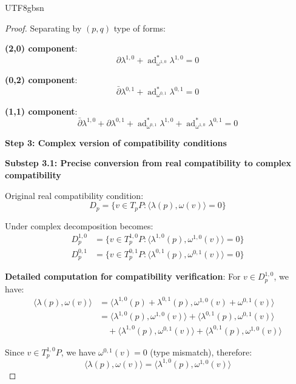 \documentclass[a4paper,12pt]{extarticle}
\theoremstyle{definition}
\begin{document}
\begin{CJK}{UTF8}{gbsn}
\begin{proof}
Separating by $(p,q)$ type of forms:

\textbf{(2,0) component}:
\begin{equation}
\partial\lambda^{1,0} + \operatorname{ad}^*_{\omega^{1,0}}\lambda^{1,0} = 0
\end{equation}

\textbf{(0,2) component}:
\begin{equation}
\bar{\partial}\lambda^{0,1} + \operatorname{ad}^*_{\omega^{0,1}}\lambda^{0,1} = 0
\end{equation}

\textbf{(1,1) component}:
\begin{equation}
\bar{\partial}\lambda^{1,0} + \partial\lambda^{0,1} + \operatorname{ad}^*_{\omega^{0,1}}\lambda^{1,0} + \operatorname{ad}^*_{\omega^{1,0}}\lambda^{0,1} = 0
\end{equation}

\textbf{Step 3: Complex version of compatibility conditions}

\textbf{Substep 3.1: Precise conversion from real compatibility to complex compatibility}

Original real compatibility condition:
\begin{equation}
D_p = \{v \in T_pP : \langle\lambda(p), \omega(v)\rangle = 0\}
\end{equation}

Under complex decomposition becomes:
\begin{align}
D^{1,0}_p &= \{v \in T^{1,0}_pP : \langle\lambda^{1,0}(p), \omega^{1,0}(v)\rangle = 0\} \\
D^{0,1}_p &= \{v \in T^{0,1}_pP : \langle\lambda^{0,1}(p), \omega^{0,1}(v)\rangle = 0\}
\end{align}

\textbf{Detailed computation for compatibility verification}:
For $v \in D^{1,0}_p$, we have:
\begin{align}
\langle\lambda(p), \omega(v)\rangle &= \langle\lambda^{1,0}(p) + \lambda^{0,1}(p), \omega^{1,0}(v) + \omega^{0,1}(v)\rangle \\
&= \langle\lambda^{1,0}(p), \omega^{1,0}(v)\rangle + \langle\lambda^{0,1}(p), \omega^{0,1}(v)\rangle \\
&\quad + \langle\lambda^{1,0}(p), \omega^{0,1}(v)\rangle + \langle\lambda^{0,1}(p), \omega^{1,0}(v)\rangle
\end{align}

Since $v \in T^{1,0}_pP$, we have $\omega^{0,1}(v) = 0$ (type mismatch), therefore:
\begin{equation}
\langle\lambda(p), \omega(v)\rangle = \langle\lambda^{1,0}(p), \omega^{1,0}(v)\rangle
\end{equation}


\end{proof}
\end{CJK}
\end{document}
